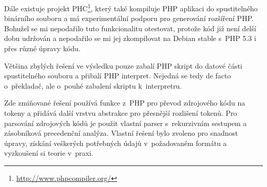 \documentclass[czech]{ExcelAtFIT}
\begin{document}

		Dále existuje projekt PHC\footnote{\url{http://www.phpcompiler.org/}}, který také kompiluje PHP aplikaci do spustitelného binárního souboru a má experimentální podporu pro generování rozšíření PHP. Bohužel se mi nepodařilo tuto funkcionalitu otestovat, protože kód již není delší dobu udržován a nepodařilo se mi jej zkompilovat na Debian stable s~PHP 5.3 i přes různé úpravy kódu.


		Většina zbylých řešení ve výsledku pouze zabalí PHP skript do datové části spustitelného souboru a přibalí PHP interpret. Nejedná se tedy de facto o~překladač, ale o~pouhé zabalení skriptu k~interpretru.



		Zde zmiňované řešení používá funkce z~PHP pro převod zdrojového kódu na tokeny a přidává další vrstvu abstrakce pro přesnější rozlišení tokenů. Pro parsování zdrojových kódů je použit vlastní parser s~rekurzivním sestupem a zásobníková precedenční analýza. Vlastní řešení bylo zvoleno pro snadnost úpravy, získání veškerých potřebných údajů v~požadovaném formátu a vyzkoušení si teorie v~praxi.
\end{document}
